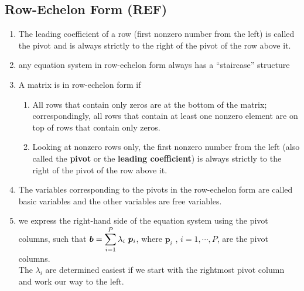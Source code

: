 \subsection{Row-Echelon Form (REF)}

\begin{enumerate}
    \item 
    \begin{definition}
        The leading coefficient of a row (first nonzero number from the left) is called the pivot and is always strictly to the right of the pivot of the row above it.
        \hfill \cite{mfml/book/mml/Deisenroth-Faisal-Ong}
    \end{definition}

    \item any equation system in row-echelon form always has a “staircase” structure
    \hfill \cite{mfml/book/mml/Deisenroth-Faisal-Ong}

    \item A matrix is in row-echelon form if
    \begin{enumerate}
        \item All rows that contain only zeros are at the bottom of the matrix; correspondingly, all rows that contain at least one nonzero element are on top of rows that contain only zeros.
        \hfill \cite{mfml/book/mml/Deisenroth-Faisal-Ong}

        \item Looking at nonzero rows only, the first nonzero number from the left (also called the \textbf{pivot} or the \textbf{leading coefficient}) is always strictly to the right of the pivot of the row above it.
        \hfill \cite{mfml/book/mml/Deisenroth-Faisal-Ong}
    \end{enumerate}

    \item The variables corresponding to the pivots in the row-echelon form are called basic variables and the other variables are free variables.
    \hfill \cite{mfml/book/mml/Deisenroth-Faisal-Ong}

    \item we express the right-hand side of the equation system using the pivot columns, such that $\bm{b} = \displaystyle\sum^P_{i=1} \lambda_i\ \bm{p}_i$, where $\bm{p}_i$ , $i = 1, \cdots , P$, are the pivot columns. 
    \\
    The $\lambda_i$ are determined easiest if we start with the rightmost pivot column and work our way to the left.
    \hfill \cite{mfml/book/mml/Deisenroth-Faisal-Ong}

    
\end{enumerate}



